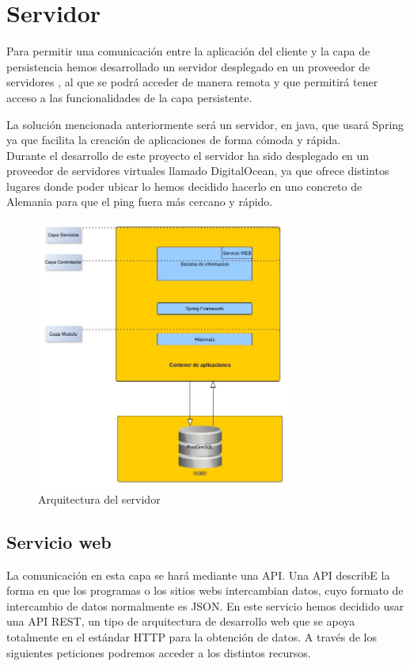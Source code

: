 \section{Servidor}
Para permitir una comunicación entre la aplicación del cliente y la capa de persistencia hemos desarrollado un servidor desplegado en un proveedor de servidores , al que se podrá acceder de manera remota y que permitirá tener acceso a las funcionalidades de la capa persistente.

La solución mencionada anteriormente será un servidor, en java, que  usará Spring ya que facilita la creación de aplicaciones de forma cómoda y rápida.\\

Durante el desarrollo de este proyecto el servidor ha sido desplegado en un proveedor de servidores virtuales llamado 
  DigitalOcean, ya que ofrece distintos lugares donde poder ubicar lo hemos decidido hacerlo en uno concreto de Alemania para que el ping fuera más cercano y rápido.
\begin{figure}[H]
		\centering
		\includegraphics[width=0.75\textwidth] {arquitectura-servidor.jpg}
		\caption{Arquitectura del servidor }
	\end{figure}


\subsection{Servicio web}
 La comunicación en esta capa se hará mediante una API. Una API describE la forma en que los programas o los sitios webs intercambian datos, cuyo formato  de intercambio de datos normalmente es JSON. En este servicio hemos decidido usar una API REST, un tipo de arquitectura de desarrollo web que se apoya totalmente en el estándar HTTP para la obtención de datos. A través de los siguientes peticiones podremos acceder a los distintos recursos.
 

